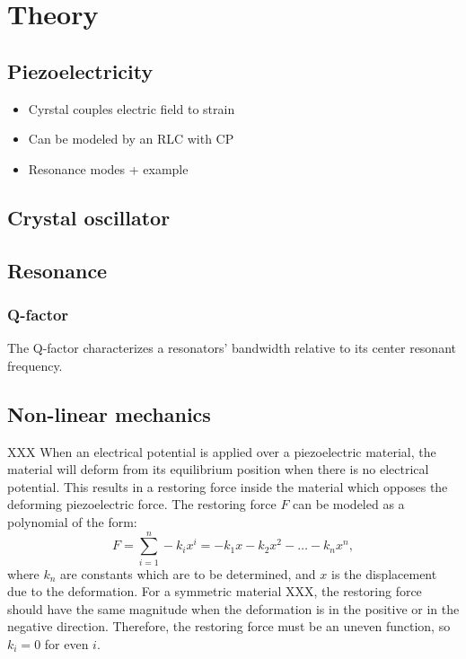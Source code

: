 
\clearpage\section{Theory}


\subsection{Piezoelectricity}
\begin{itemize}
	\item Cyrstal couples electric field to strain
	\item Can be modeled by an RLC with CP
	\item Resonance modes + example
\end{itemize}

\subsection{Crystal oscillator}


\subsection{Resonance}



\subsubsection{Q-factor}
The Q-factor characterizes a resonators' bandwidth relative to its center resonant frequency.\cite{electroniccircuits} 

\subsection{Non-linear mechanics}
XXX When an electrical potential is applied over a piezoelectric material, the material will deform from its equilibrium position when there is no electrical potential. This results in a restoring force inside the material which opposes the deforming piezoelectric force. The restoring force $F$ can be modeled as a polynomial of the form:
\begin{equation}\label{eq:restoring_polynomial}
F = \sum\limits_{i=1}^n -k_ix^i = - k_1x - k_2x^2 - \dots - k_{n}x^{n},
\end{equation}
where $k_n$ are constants which are to be determined, and $x$ is the displacement due to the deformation. For a symmetric material XXX, the restoring force should have the same magnitude when the deformation is in the positive or in the negative direction. Therefore, the restoring force must be an uneven function, so $k_i=0$ for even $i$.


